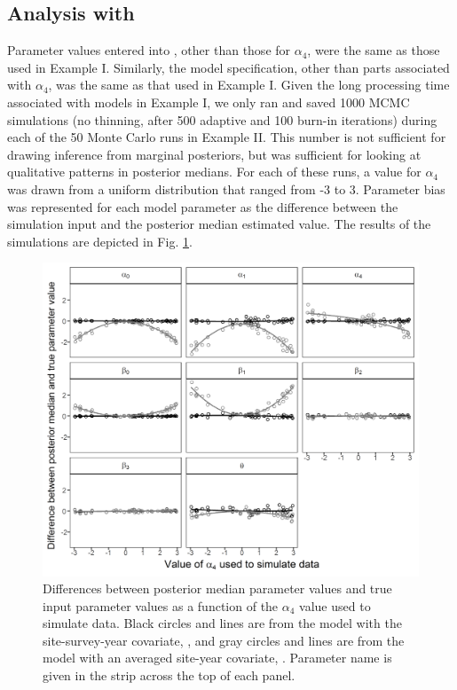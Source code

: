 \documentclass[codesnippet]{jss}
\begin{document}
\subsection[Analysis with JAGS]{Analysis with }
Parameter values entered into , other than those for $\alpha_4$, were the same as those used in Example I.  Similarly, the  model specification, other than parts associated with $\alpha_4$, was the same as that used in Example I. Given the long processing time associated with  models in Example I, we only ran and saved 1000 MCMC simulations (no thinning, after 500 adaptive and 100 burn-in iterations) during each of the 50 Monte Carlo runs in Example II. This number is not sufficient for drawing inference from marginal posteriors, but was sufficient for looking at qualitative patterns in posterior medians. For each of these runs, a value for $\alpha_4$ was drawn from a uniform distribution that ranged from -3 to 3. Parameter bias was represented for each model parameter as the difference between the simulation input and the posterior median estimated value. The results of the simulations are depicted in Fig. \ref{fig:fig2}.

\begin{figure}
\includegraphics[width=\linewidth]{jss3107fig2.png}
\caption{Differences between posterior median parameter values and true input parameter values as a function of the $\alpha_4$ value used to simulate data. Black circles and lines are from the model with the site-survey-year covariate, , and gray circles and lines are from the model with an averaged site-year covariate, . Parameter name is given in the strip across the top of each panel.}
\label{fig:fig2}
\end{figure}
\end{document}
